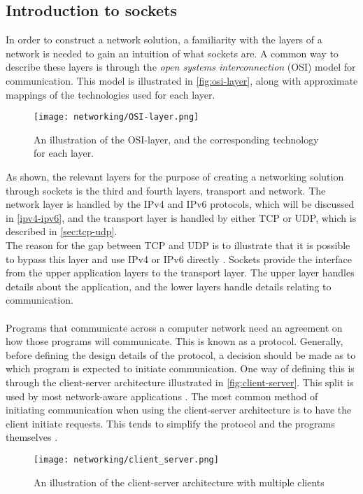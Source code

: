 \subsection{Introduction to sockets}
In order to construct a network solution, a familiarity with the layers of a network is needed to gain an intuition of what sockets are.
A common way to describe these layers is through the \textit{open systems interconnection} (OSI) model for communication.
This model is illustrated in \autoref{fig:osi-layer}, along with approximate mappings of the technologies used for each layer.
\begin{figure}[H]
    \centering
    \texttt{[image: networking/OSI-layer.png]}
    \caption{An illustration of the OSI-layer, and the corresponding technology for each layer.}
    \label{fig:osi-layer}
\end{figure}
\noindent
As shown, the relevant layers for the purpose of creating a networking solution through sockets is the third and fourth layers, transport and network.
The network layer is handled by the IPv4 and IPv6 protocols, which will be discussed in \autoref{ipv4-ipv6}, and the transport layer is handled by either TCP or UDP, which is described in \autoref{sec:tcp-udp}.\\
The reason for the gap between TCP and UDP is to illustrate that it is possible to bypass this layer and use IPv4 or IPv6 directly \cite{socketnetworking}.
Sockets provide the interface from the upper application layers to the transport layer.
The upper layer handles details about the application, and the lower layers handle details relating to communication.
\\\\
Programs that communicate across a computer network need an agreement on how those programs will communicate.
This is known as a protocol.
Generally, before defining the design details of the protocol, a decision should be made as to which program is expected to initiate communication.
One way of defining this is through the client-server architecture illustrated in \autoref{fig:client-server}.
This split is used by most network-aware applications \cite{socketnetworking}.
The most common method of initiating communication when using the client-server architecture is to have the client initiate requests.
This tends to simplify the protocol and the programs themselves \cite{socketnetworking}.

\begin{figure}[H]
    \centering
    \texttt{[image: networking/client\_server.png]}
    \caption{An illustration of the client-server architecture with multiple clients}
    \label{fig:client-server}
\end{figure}


